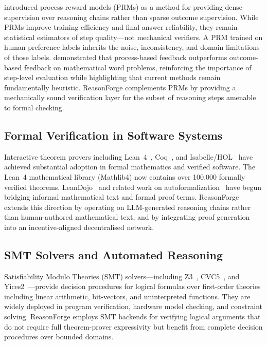 \documentclass[11pt,a4paper]{article}
\begin{document}
\citet{lightman2023verify} introduced process reward models (PRMs) as a
method for providing dense supervision over reasoning chains rather than
sparse outcome supervision.  While PRMs improve training efficiency and
final-answer reliability, they remain statistical estimators of step
quality---not mechanical verifiers.  A PRM trained on human preference
labels inherits the noise, inconsistency, and domain limitations of those
labels.  \citet{uesato2022solving} demonstrated that process-based
feedback outperforms outcome-based feedback on mathematical word
problems, reinforcing the importance of step-level evaluation while
highlighting that current methods remain fundamentally heuristic.
ReasonForge complements PRMs by providing a mechanically sound
verification layer for the subset of reasoning steps amenable to formal
checking.

\subsection{Formal Verification in Software Systems}

Interactive theorem provers including Lean~4~\citep{demoura2021lean4},
Coq~\citep{coq2023}, and Isabelle/HOL~\citep{nipkow2002isabelle} have
achieved substantial adoption in formal mathematics and verified
software.  The Lean~4 mathematical library (Mathlib4) now contains over
100{,}000 formally verified theorems.
LeanDojo~\citep{yang2023leandojo} and related work on
autoformalization~\citep{wu2022autoformalization} have begun bridging
informal mathematical text and formal proof terms.  ReasonForge extends
this direction by operating on LLM-generated reasoning chains rather than
human-authored mathematical text, and by integrating proof generation
into an incentive-aligned decentralised network.

\subsection{SMT Solvers and Automated Reasoning}

Satisfiability Modulo Theories (SMT) solvers---including
Z3~\citep{demoura2008z3}, CVC5~\citep{barbosa2022cvc5}, and
Yices2~\citep{dutertre2014yices}---provide decision procedures for
logical formulas over first-order theories including linear arithmetic,
bit-vectors, and uninterpreted functions.  They are widely deployed in
program verification, hardware model checking, and constraint solving.
ReasonForge employs SMT backends for verifying logical arguments that do
not require full theorem-prover expressivity but benefit from complete
decision procedures over bounded domains.
\end{document}
